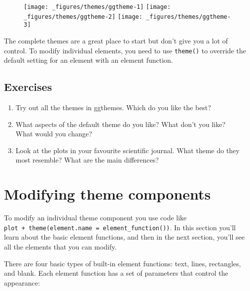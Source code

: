 \begin{figure}[H]
  \texttt{[image: \_figures/themes/ggtheme-1]}%
  \texttt{[image: \_figures/themes/ggtheme-2]}%
  \texttt{[image: \_figures/themes/ggtheme-3]}
\end{figure}

The complete themes are a great place to start but don't give you a lot
of control. To modify individual elements, you need to use
\texttt{theme()} to override the default setting for an element with an
element function.

\subsection{Exercises}

\begin{enumerate}
\def\labelenumi{\arabic{enumi}.}
\item
  Try out all the themes in ggthemes. Which do you like the best?
\item
  What aspects of the default theme do you like? What don't you like?\\
  What would you change?
\item
  Look at the plots in your favourite scientific journal. What theme do
  they most resemble? What are the main differences?
\end{enumerate}

\section{Modifying theme components}

To modify an individual theme component you use code like
\texttt{plot\ +\ theme(element.name\ =\ element\_function())}. In this
section you'll learn about the basic element functions, and then in the
next section, you'll see all the elements that you can modify.

There are four basic types of built-in element functions: text, lines,
rectangles, and blank. Each element function has a set of parameters
that control the appearance:

